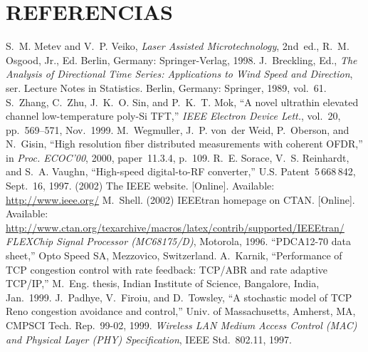 ﻿\documentclass[10pt,twocolumn]{article}
\begin{document}
\section*{REFERENCIAS}
\begin{thebibliography}{12}
   S.~M. Metev and V.~P. Veiko, \textit{Laser Assisted Microtechnology}, 2nd~ed., R.~M. Osgood, Jr., Ed. Berlin, Germany: Springer-Verlag, 1998.
   J.~Breckling, Ed., \textit{The Analysis of Directional Time Series: Applications to Wind Speed and Direction}, ser. Lecture Notes in Statistics. Berlin, Germany: Springer, 1989, vol.~61.
   S.~Zhang, C.~Zhu, J.~K.~O. Sin, and P.~K.~T. Mok, “A novel ultrathin elevated channel low-temperature poly-Si TFT,” \textit{IEEE Electron Device Lett.}, vol.~20, pp.~569--571, Nov.~1999.
   M.~Wegmuller, J.~P. von~der Weid, P.~Oberson, and N.~Gisin, “High resolution fiber distributed measurements with coherent OFDR,” in \textit{Proc. ECOC'00}, 2000, paper~11.3.4, p.~109.
   R.~E. Sorace, V.~S. Reinhardt, and S.~A. Vaughn, “High-speed digital-to-RF converter,” U.S. Patent~5\,668\,842, Sept.~16, 1997.
   (2002) The IEEE website. [Online]. Available: \url{http://www.ieee.org/}
   M.~Shell. (2002) IEEEtran homepage on CTAN. [Online]. Available: \url{http://www.ctan.org/texarchive/macros/latex/contrib/supported/IEEEtran/}
   \textit{FLEXChip Signal Processor (MC68175/D)}, Motorola, 1996.
   “PDCA12-70 data sheet,” Opto Speed SA, Mezzovico, Switzerland.
   A.~Karnik, “Performance of TCP congestion control with rate feedback: TCP/ABR and rate adaptive TCP/IP,” M.~Eng. thesis, Indian Institute of Science, Bangalore, India, Jan.~1999.
   J.~Padhye, V.~Firoiu, and D.~Towsley, “A stochastic model of TCP Reno congestion avoidance and control,” Univ. of Massachusetts, Amherst, MA, CMPSCI Tech. Rep.~99-02, 1999.
   \textit{Wireless LAN Medium Access Control (MAC) and Physical Layer (PHY) Specification}, IEEE Std.~802.11, 1997.
\end{thebibliography}
\end{document}
